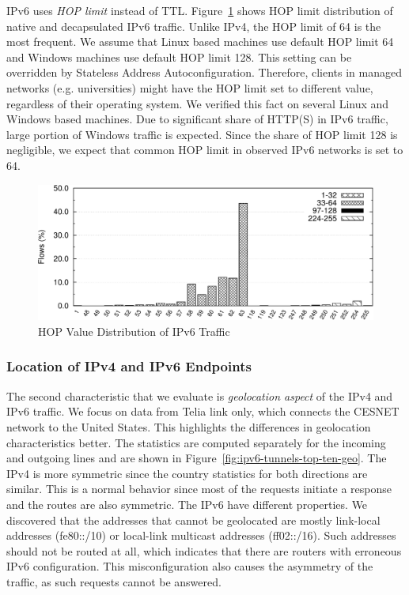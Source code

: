 IPv6 uses \textit{HOP limit} instead of TTL. Figure~\ref{fig:ipv6-tunnels-ipv6-native-hop} shows HOP limit distribution of native and decapsulated IPv6 traffic. Unlike IPv4, the HOP limit of 64 is the most frequent. We assume that Linux based machines use default HOP limit 64 and Windows machines use default HOP limit 128. This setting can be overridden by Stateless Address Autoconfiguration. Therefore, clients in managed networks (e.g. universities) might have the HOP limit set to different value, regardless of their operating system. We verified this fact on several Linux and Windows based machines. Due to significant share of HTTP(S) in IPv6 traffic, large portion of Windows traffic is expected. Since the share of HOP limit 128 is negligible, we expect that common HOP limit in observed IPv6 networks is set to 64.

\begin{figure}[!tb]
        \centering
        \includegraphics[width=1.00\linewidth]{figures/paper-tunnels/ttl/native-hop}
        \caption{HOP Value Distribution of IPv6 Traffic}
        \label{fig:ipv6-tunnels-ipv6-native-hop}
\end{figure}


\subsubsection{Location of IPv4 and IPv6 Endpoints}
The second characteristic that we evaluate is \textit{geolocation aspect} of the IPv4 and IPv6 traffic. We focus on data from Telia link only, which connects the CESNET network to the United States. This highlights the differences in geolocation characteristics better. The statistics are computed separately for the incoming and outgoing lines and are shown in Figure~\ref{fig:ipv6-tunnels-top-ten-geo}. The IPv4 is more symmetric since the country statistics for both directions are similar. This is a normal behavior since most of the requests initiate a response and the routes are also symmetric. The IPv6 have different properties. We discovered that the addresses that cannot be geolocated are mostly link-local addresses (fe80::/10) or local-link multicast addresses (ff02::/16). Such addresses should not be routed at all, which indicates that there are routers with erroneous IPv6 configuration. This misconfiguration also causes the asymmetry of the traffic, as such requests cannot be answered.

